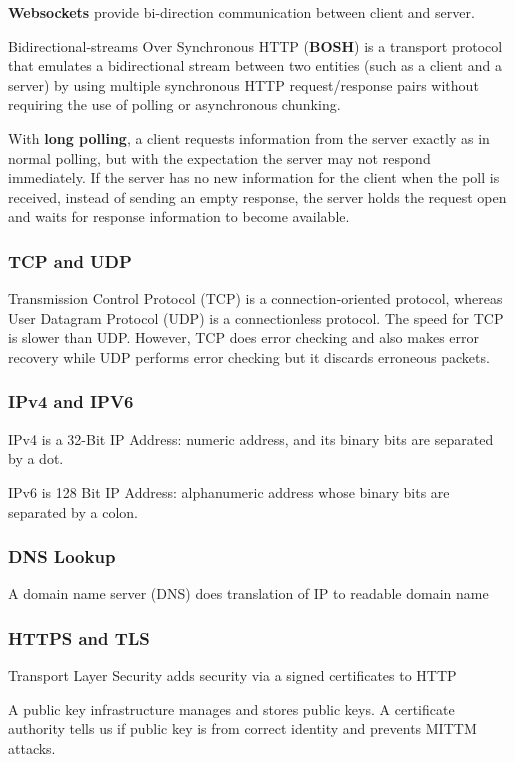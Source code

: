 \documentclass{article}
\begin{document}
    \textbf{Websockets} provide bi-direction communication between client and server.
    
    Bidirectional-streams Over Synchronous HTTP (\textbf{BOSH}) is a transport protocol that emulates a bidirectional stream between two entities (such as a client and a server) by using multiple synchronous HTTP request/response pairs without requiring the use of polling or asynchronous chunking.
    
    With \textbf{long polling}, a client requests information from the server exactly as in normal polling, but with the expectation the server may not respond immediately. If the server has no new information for the client when the poll is received, instead of sending an empty response, the server holds the request open and waits for response information to become available.
    
    \subsubsection{TCP and UDP}
    Transmission Control Protocol (TCP) is a connection-oriented protocol, whereas User Datagram Protocol (UDP) is a connectionless protocol. The speed for TCP is slower than UDP. However, TCP does error checking and also makes error recovery  while UDP performs error checking but it discards erroneous packets.
    
    \subsubsection{IPv4 and IPV6}
    IPv4 is a 32-Bit IP Address: numeric address, and its binary bits are separated by a dot.
    
    IPv6 is 128 Bit IP Address: alphanumeric address whose binary bits are separated by a colon.

    \subsubsection{DNS Lookup}
    A domain name server (DNS) does translation of IP to readable domain name
    
    \subsubsection{HTTPS and TLS}
    Transport Layer Security adds security via a signed certificates to HTTP
    
    A public key infrastructure manages and stores public keys. A certificate authority tells us if public key is from correct identity and prevents MITTM attacks.
\end{document}
